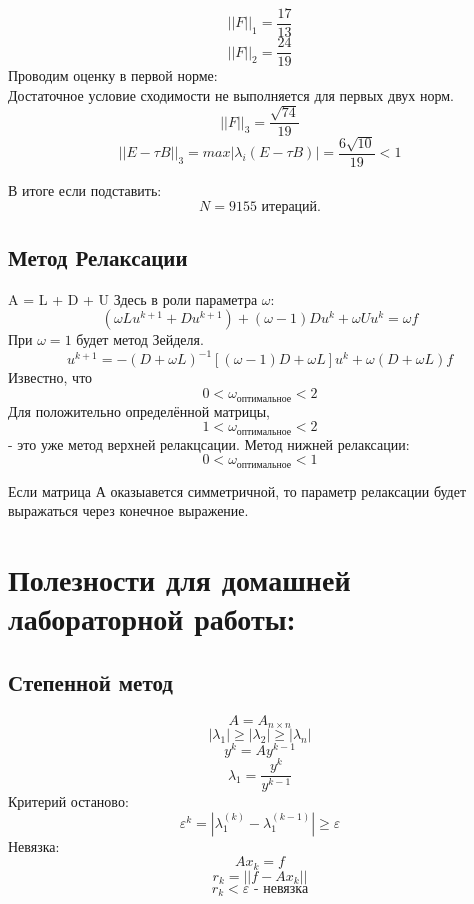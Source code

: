 \documentclass[a4paper,12pt]{article}
\begin{document}
    $$||F||_1 = \frac{17}{13}$$
    $$||F||_2 = \frac{24}{19}$$
    Проводим оценку в первой норме:\\
    Достаточное условие сходимости не выполняется для первых двух норм.\\
    
    $$||F||_3 = \frac{\sqrt{74}}{19}$$
    $$||E - \tau B||_3 = max |\lambda_i (E - \tau B)| = \frac{6\sqrt{10}}{19} < 1$$
    
    В итоге если подставить:\\
    $$N = 9155 \text{ итераций.}$$
    
    \subsection{Метод Релаксации}
    
    A = L + D + U
    Здесь в роли параметра $\omega$:\\
    $$(\omega L u^{k+1} + Du^{k+1}) + (\omega - 1)Du^k +\omega U u^k = \omega f$$
    При $\omega = 1$ будет метод Зейделя.
    $$u^{k+1} = -(D + \omega L)^{-1} [(\omega - 1)D + \omega L]u^k + \omega (D + \omega L)f$$
    Известно, что 
    $$0 < \omega_\text{оптимальное} < 2$$
    Для положительно определённой матрицы,
    $$1 < \omega_\text{оптимальное} < 2$$
    - это уже метод верхней релакцсации.
    Метод нижней релаксации:
    $$0 < \omega_\text{оптимальное} < 1$$
    
    Если матрица А оказыавется симметричной, то параметр релаксации будет выражаться через конечное выражение.\\
    
\section{Полезности для домашней лабораторной работы:}
    \subsection*{Степенной метод}
    $$A = A_{n \times n}$$
    $$|\lambda_1| \geq |\lambda_2| \geq |\lambda_n|$$
    $$y^k = Ay^{k-1}$$
    $$\lambda_1 = \frac{y^k}{y^{k-1}}$$
    Критерий останово:
    $$\varepsilon^k = |\lambda_1^{(k)}-\lambda_1^{(k-1)}| \geq \varepsilon$$
    Невязка:
    $$Ax_k = f$$
    $$r_k = ||f-Ax_k||$$
    $$r_k < \varepsilon \text{ - невязка}$$
    
\end{document}
